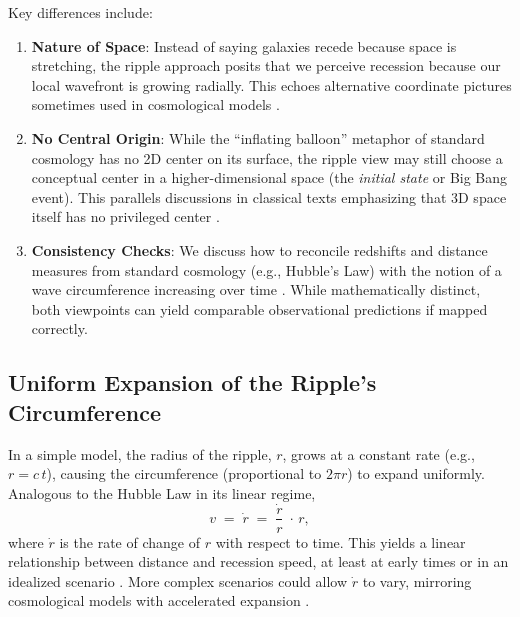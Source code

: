 \documentclass{article}
\begin{document}
Key differences include:
\begin{enumerate}
  \item \textbf{Nature of Space}: Instead of saying galaxies recede because space is stretching, the ripple approach posits that we perceive recession because our local wavefront is growing radially. This echoes alternative coordinate pictures sometimes used in cosmological models \cite{hawking1988, penrose2004}.
  \item \textbf{No Central Origin}: While the ``inflating balloon'' metaphor of standard cosmology has no 2D center on its surface, the ripple view may still choose a conceptual center in a higher-dimensional space (the \textit{initial state} or Big Bang event). This parallels discussions in classical texts emphasizing that 3D space itself has no privileged center \cite{rindler1977essential, misner1973}.
  \item \textbf{Consistency Checks}: We discuss how to reconcile redshifts and distance measures from standard cosmology (e.g., Hubble’s Law) with the notion of a wave circumference increasing over time \cite{susskind2008}. While mathematically distinct, both viewpoints can yield comparable observational predictions if mapped correctly.
\end{enumerate}

\subsection{Uniform Expansion of the Ripple's Circumference}
\label{subsec:uniform-expansion}
In a simple model, the radius of the ripple, \(r\), grows at a constant 
rate (e.g., \(r = c\,t\)), causing the circumference (proportional to 
\(2\pi r\)) to expand uniformly. Analogous to the Hubble Law in its 
linear regime,
\[
  v \;=\; \dot{r} \;=\; \frac{\dot{r}}{r}\;\cdot\,r,
\]
where \(\dot{r}\) is the rate of change of \(r\) with respect to time. 
This yields a linear relationship between distance and recession speed, 
at least at early times or in an idealized scenario \cite{rindler1977essential}. 
More complex scenarios could allow \(\dot{r}\) to vary, mirroring 
cosmological models with accelerated expansion \cite{hawking1988, penrose2004}.
\end{document}
